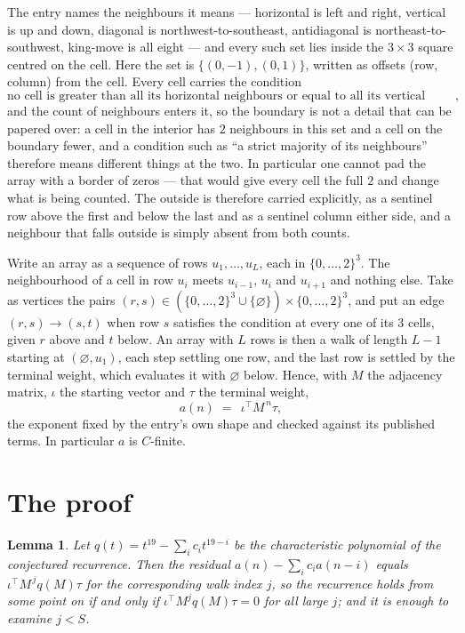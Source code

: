 \documentclass[11pt,a4paper]{article}
\theoremstyle{plain}
\newtheorem{lemma}[theorem]{Lemma}
\theoremstyle{definition}
\begin{document}
The entry names the neighbours it means --- horizontal is left and right, vertical is up and
down, diagonal is northwest-to-southeast, antidiagonal is northeast-to-southwest, king-move is
all eight --- and every such set lies inside the $3\times3$ square centred on the cell. Here
the set is $\{(0,-1), (0,1)\}$, written as offsets (row, column) from the cell. Every cell carries
the condition
\[
\text{no cell is greater than all its horizontal neighbours or equal to all its vertical neighbours},
\]
and the count of neighbours enters it, so the boundary is not a detail that can be papered
over: a cell in the interior has $2$ neighbours in this set and a cell on the boundary
fewer, and a condition such as ``a strict majority of its neighbours'' therefore means
different things at the two. In particular one cannot pad the array with a border of zeros ---
that would give every cell the full $2$ and change what is being counted. The outside is
therefore carried
explicitly, as a sentinel row above the first and below the last and as a sentinel column
either side, and a neighbour that falls outside is simply absent from both counts.

Write an array as a sequence of rows $u_1,\dots,u_L$, each in
$\{0,\dots,2\}^{3}$. The neighbourhood of a cell in row $u_i$ meets $u_{i-1}$,
$u_i$ and $u_{i+1}$ and nothing else. Take as vertices the pairs
$(r,s)\in(\{0,\dots,2\}^{3}\cup\{\varnothing\})\times\{0,\dots,2\}^{3}$,
and put an edge $(r,s)\to(s,t)$ when row $s$ satisfies the condition at every one of its
$3$ cells, given $r$ above and $t$ below. An array with $L$ rows is then a walk of length
$L-1$ starting at $(\varnothing,u_1)$, each step settling one row, and the last row is
settled by the terminal weight, which evaluates it with $\varnothing$ below. Hence,
with $M$ the adjacency matrix, $\iota$ the starting vector and $\tau$ the terminal weight,
\[
a(n)\;=\;\,\iota^{\!\top}M^{\,n}\tau ,
\]
the exponent fixed by the entry's own shape and checked against its published terms. In
particular $a$ is $C$-finite.

\section{The proof}

\begin{lemma}\label{lem:crit}
Let $q(t)=t^{19}-\sum_i c_it^{19-i}$ be the characteristic polynomial of the
conjectured recurrence. Then the residual $a(n)-\sum_ic_ia(n-i)$ equals
$\iota^{\!\top}M^{\,j}q(M)\tau$ for the corresponding walk index $j$, so the
recurrence holds from some point on if and only if $\iota^{\!\top}M^{j}q(M)\tau=0$ for all
large $j$; and it is enough to examine $j<S$.
\end{lemma}
\end{document}
